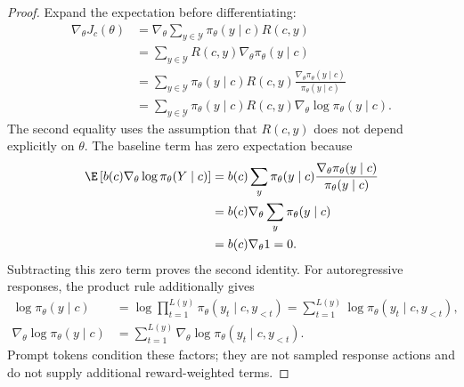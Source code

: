 \begin{proof}
Expand the expectation before differentiating:
\begin{align}
\nabla_\theta J_c(\theta)
&=\nabla_\theta\sum_{y\in\mathcal Y}\pi_\theta(y\mid c)R(c,y)\\
&=\sum_{y\in\mathcal Y}R(c,y)\nabla_\theta\pi_\theta(y\mid c)\\
&=\sum_{y\in\mathcal Y}\pi_\theta(y\mid c)R(c,y)
 \frac{\nabla_\theta\pi_\theta(y\mid c)}{\pi_\theta(y\mid c)}\\
&=\sum_{y\in\mathcal Y}\pi_\theta(y\mid c)R(c,y)
 \nabla_\theta\log\pi_\theta(y\mid c).
\end{align}
The second equality uses the assumption that $R(c,y)$ does not depend explicitly on $\theta$. The baseline term has zero expectation because
\begin{align}
\E\left[b(c)\nabla_\theta\log\pi_\theta(Y\mid c)\right]
&=b(c)\sum_y\pi_\theta(y\mid c)
 \frac{\nabla_\theta\pi_\theta(y\mid c)}{\pi_\theta(y\mid c)}\\
&=b(c)\nabla_\theta\sum_y\pi_\theta(y\mid c)\\
&=b(c)\nabla_\theta 1=0.
\end{align}
Subtracting this zero term proves the second identity. For autoregressive responses, the product rule additionally gives
\begin{align}
\log\pi_\theta(y\mid c)
&=\log\prod_{t=1}^{L(y)}\pi_\theta(y_t\mid c,y_{<t})
 =\sum_{t=1}^{L(y)}\log\pi_\theta(y_t\mid c,y_{<t}),\\
\nabla_\theta\log\pi_\theta(y\mid c)
&=\sum_{t=1}^{L(y)}\nabla_\theta\log\pi_\theta(y_t\mid c,y_{<t}).
\end{align}
Prompt tokens condition these factors; they are not sampled response actions and do not supply additional reward-weighted terms.
\end{proof}

